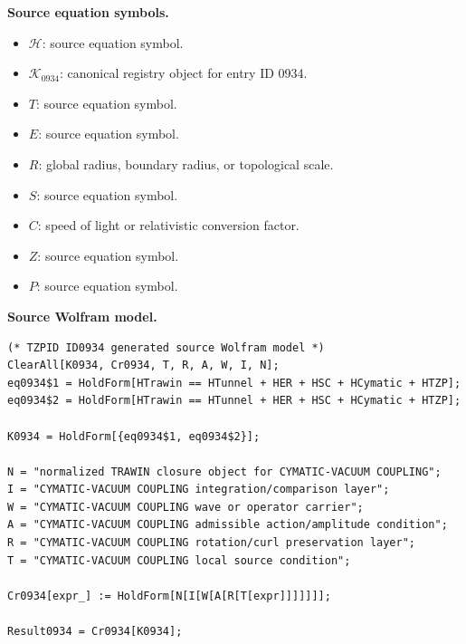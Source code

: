 \begin{minipage}[t]{0.49\linewidth}
\begingroup
\small
\raggedright
\textbf{Source equation symbols.}\par
\begin{itemize}[leftmargin=1.35em,itemsep=1pt,topsep=1pt,parsep=0pt]
    \item $\mathcal{H}$: source equation symbol.
    \item $\mathcal{K}_{0934}$: canonical registry object for entry ID 0934.
    \item $T$: source equation symbol.
    \item $E$: source equation symbol.
    \item $R$: global radius, boundary radius, or topological scale.
    \item $S$: source equation symbol.
    \item $C$: speed of light or relativistic conversion factor.
    \item $Z$: source equation symbol.
    \item $P$: source equation symbol.
\end{itemize}
\endgroup
\end{minipage}\hfill
\begin{minipage}[t]{0.47\linewidth}
\begingroup
\scriptsize
\raggedright
\textbf{Source Wolfram model.}\par
\begin{Verbatim}[fontsize=\tiny,breaklines=true,breakanywhere=true]
(* TZPID ID0934 generated source Wolfram model *)
ClearAll[K0934, Cr0934, T, R, A, W, I, N];
eq0934$1 = HoldForm[HTrawin == HTunnel + HER + HSC + HCymatic + HTZP];
eq0934$2 = HoldForm[HTrawin == HTunnel + HER + HSC + HCymatic + HTZP];

K0934 = HoldForm[{eq0934$1, eq0934$2}];

N = "normalized TRAWIN closure object for CYMATIC-VACUUM COUPLING";
I = "CYMATIC-VACUUM COUPLING integration/comparison layer";
W = "CYMATIC-VACUUM COUPLING wave or operator carrier";
A = "CYMATIC-VACUUM COUPLING admissible action/amplitude condition";
R = "CYMATIC-VACUUM COUPLING rotation/curl preservation layer";
T = "CYMATIC-VACUUM COUPLING local source condition";

Cr0934[expr_] := HoldForm[N[I[W[A[R[T[expr]]]]]]];

Result0934 = Cr0934[K0934];
\end{Verbatim}
\endgroup
\end{minipage}

